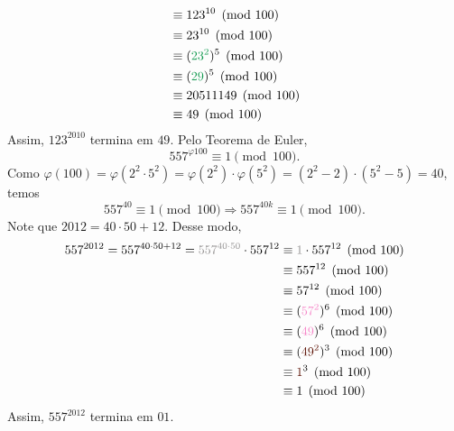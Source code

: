 \documentclass[12pt, a4paper]{article}
\newcommand{\negrito}[1]{\mbox{\boldmath{$#1$}}}
\newcommand{\alt}[1]{\textcolor{Floresta}{$\negrito{(#1)} $}}
\begin{document}
\begin{solution}
{\begin{align*}
    &\equiv 123^{10} \pmod{100} \\
    &\equiv 23^{10} \pmod{100} \\
    &\equiv (\textcolor{ForestGreen}{23^2})^5 \pmod{100} \\
   &\equiv (\textcolor{ForestGreen}{29})^5 \pmod{100} \\
   &\equiv 20511149 \pmod{100} \\
   &\equiv 49 \pmod{100}
\end{align*}
 Assim, $123^{2010}$ termina em $49$.
  \task[\alt{f}] Pelo Teorema de Euler,
  \[
  557^{\varphi{100}} \equiv 1 \pmod{100}.
  \]
  Como $\varphi(100)=\varphi(2^2\cdot5^2)=\varphi(2^2)\cdot\varphi(5^2)=(2^2-2)\cdot(5^2-5)=40$, temos
  \[557^{40} \equiv 1 \pmod{100} \Rightarrow 557^{40k}\equiv 1 \pmod{100}.\] 
Note que $2012=40\cdot50+12.$ Desse modo,
\begin{align*}
    557^{2012} = 557^{40 \cdot 50 + 12} = \textcolor{Gray}{557^{40 \cdot 50}} \cdot 557^{12} &\equiv \textcolor{Gray}{1} \cdot 557^{12} \pmod{100} \\
    &\equiv 557^{12} \pmod{100} \\
    &\equiv 57^{12} \pmod{100} \\
    &\equiv (\textcolor{Lavender}{57^2})^6 \pmod{100} \\
   &\equiv (\textcolor{Lavender}{49})^6 \pmod{100} \\
   &\equiv (\textcolor{Sepia}{49^2})^3 \pmod{100} \\
   &\equiv \textcolor{Sepia}{1}^3 \pmod{100} \\
   &\equiv 1 \pmod{100}
\end{align*}
 Assim, $557^{2012}$ termina em $01$.
}
\end{solution}
\end{document}
